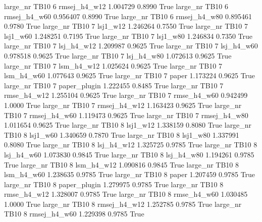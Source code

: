  large_nr     TB10                 6 rmsej_h4_w12    1.004729      0.8990    True
  large_nr     TB10                 6 rmsej_h4_w60    0.956407      0.8990    True
  large_nr     TB10                 6 rmsej_h4_w80    0.895461      0.9780    True
  large_nr     TB10                 7     lsj1_w12    1.246264      0.7550    True
  large_nr     TB10                 7     lsj1_w60    1.248251      0.7195    True
  large_nr     TB10                 7     lsj1_w80    1.246834      0.7350    True
  large_nr     TB10                 7   lsj_h4_w12    1.209987      0.9625    True
  large_nr     TB10                 7   lsj_h4_w60    0.978518      0.9625    True
  large_nr     TB10                 7   lsj_h4_w80    1.072613      0.9625    True
  large_nr     TB10                 7   lsm_h4_w12    1.025624      0.9625    True
  large_nr     TB10                 7   lsm_h4_w60    1.077643      0.9625    True
  large_nr     TB10                 7        paper    1.173224      0.9625    True
  large_nr     TB10                 7 paper_plugin    1.222455      0.8485    True
  large_nr     TB10                 7  rmse_h4_w12    1.255104      0.9625    True
  large_nr     TB10                 7  rmse_h4_w60    0.942499      1.0000    True
  large_nr     TB10                 7 rmsej_h4_w12    1.163423      0.9625    True
  large_nr     TB10                 7 rmsej_h4_w60    1.119473      0.9625    True
  large_nr     TB10                 7 rmsej_h4_w80    1.011654      0.9625    True
  large_nr     TB10                 8     lsj1_w12    1.338159      0.8080    True
  large_nr     TB10                 8     lsj1_w60    1.340659      0.7870    True
  large_nr     TB10                 8     lsj1_w80    1.337991      0.8080    True
  large_nr     TB10                 8   lsj_h4_w12    1.325725      0.9785    True
  large_nr     TB10                 8   lsj_h4_w60    1.073830      0.9845    True
  large_nr     TB10                 8   lsj_h4_w80    1.194261      0.9785    True
  large_nr     TB10                 8   lsm_h4_w12    1.090816      0.9845    True
  large_nr     TB10                 8   lsm_h4_w60    1.238635      0.9785    True
  large_nr     TB10                 8        paper    1.207459      0.9785    True
  large_nr     TB10                 8 paper_plugin    1.279975      0.9785    True
  large_nr     TB10                 8  rmse_h4_w12    1.328007      0.9785    True
  large_nr     TB10                 8  rmse_h4_w60    1.030485      1.0000    True
  large_nr     TB10                 8 rmsej_h4_w12    1.252785      0.9785    True
  large_nr     TB10                 8 rmsej_h4_w60    1.229398      0.9785    True

